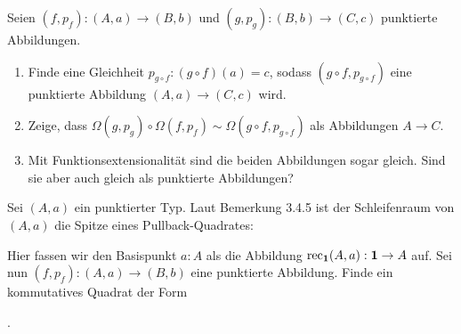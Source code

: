 \documentclass{uebung}
\begin{document}

\begin{exercise}
  Seien $(f,p_f):(A,a)\to (B,b)$ und $(g,p_g):(B,b)\to (C,c)$ punktierte Abbildungen.
  \begin{enumerate}
    \item Finde eine Gleichheit $p_{g\circ f}:(g\circ f)(a)=c$, sodass $(g\circ f,p_{g\circ f})$ eine punktierte Abbildung $(A,a)\to (C,c)$ wird.
    \item Zeige, dass $\Omega(g,p_g)\circ\Omega(f,p_f) \sim \Omega(g\circ f,p_{g\circ f})$ als Abbildungen $A\to C$.
    \item Mit Funktionsextensionalität sind die beiden Abbildungen sogar gleich.
      Sind sie aber auch gleich als punktierte Abbildungen?
  \end{enumerate}
\end{exercise}

\begin{exercise}
  Sei $(A,a)$ ein punktierter Typ.
  Laut Bemerkung 3.4.5 ist der Schleifenraum von $(A,a)$ die Spitze eines Pullback-Quadrates:
  \begin{center}
  \end{center}
  Hier fassen wir den Basispunkt $a:A$ als die Abbildung $\mathrm{rec}_{\mathbf{1}}(A,a):\mathbf{1} \to A$ auf.
  Sei nun $(f,p_f):(A,a)\to (B,b)$ eine punktierte Abbildung.
  Finde ein kommutatives Quadrat der Form
  \begin{center}
    .
  \end{center}
\end{exercise}
\end{document}
